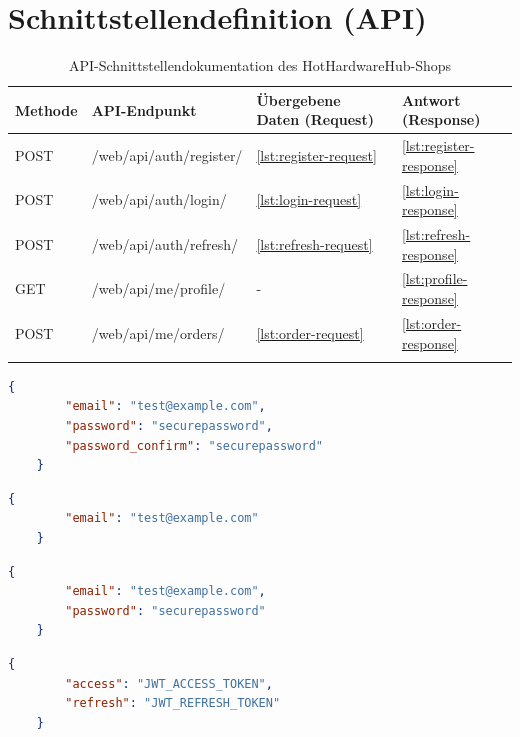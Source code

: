 \documentclass[%
	12pt,
	a4paper,
	oneside,
	parskip=full
]{scrbook}
\begin{document}
\chapter{Schnittstellendefinition (API)}

\begin{longtable}{|l|l|l|l|}
	\hline
	\textbf{Methode} & \textbf{API-Endpunkt} & \textbf{Übergebene Daten (Request)} & \textbf{Antwort (Response)} \\
	\hline
	POST & /web/api/auth/register/ & \ref{lst:register-request} & \ref{lst:register-response} \\
	\hline
	POST & /web/api/auth/login/ & \ref{lst:login-request} & \ref{lst:login-response} \\
	\hline
	POST & /web/api/auth/refresh/ & \ref{lst:refresh-request} & \ref{lst:refresh-response} \\
	\hline
	GET & /web/api/me/profile/ & - & \ref{lst:profile-response} \\
	\hline
	POST & /web/api/me/orders/ & \ref{lst:order-request} & \ref{lst:order-response} \\
	\hline
	\caption{API-Schnittstellendokumentation des HotHardwareHub-Shops}
	\label{tab:api_docs}
\end{longtable}

\begin{lstlisting}[language=json, caption={Request für Registrierung}, label=lst:register-request]
	{
		"email": "test@example.com",
		"password": "securepassword",
		"password_confirm": "securepassword"
	}
\end{lstlisting}

\begin{lstlisting}[language=json, caption={Response für Registrierung}, label=lst:register-response]
	{
		"email": "test@example.com"
	}
\end{lstlisting}

\begin{lstlisting}[language=json, caption={Request für Login}, label=lst:login-request]
	{
		"email": "test@example.com",
		"password": "securepassword"
	}
\end{lstlisting}

\begin{lstlisting}[language=json, caption={Response für Login}, label=lst:login-response]
	{
		"access": "JWT_ACCESS_TOKEN",
		"refresh": "JWT_REFRESH_TOKEN"
	}
\end{lstlisting}
\end{document}
